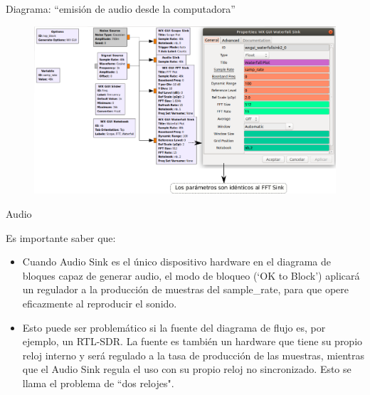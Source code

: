 \begin{frame}{Diagrama:  ``emisión de audio desde la computadora''}

\begin{figure}

\begin{center}
\vspace{-8mm}
\includegraphics[width=1.05\textwidth]{parte1/lab4/pdf/lab4_4.pdf}
\end{center}
\end{figure}

\end{frame}

\begin{frame}{Audio}

Es importante saber que:\\
\begin{itemize}
    \item
    {Cuando Audio Sink es el único dispositivo hardware en el diagrama de bloques capaz de generar audio, el modo de bloqueo (‘OK to Block’) aplicará un regulador a la producción de muestras del sample\_rate, para que opere eficazmente al reproducir el sonido\cite{Seeber2014}.}
    \item
    {Esto puede ser problemático si la fuente del diagrama de flujo es, por ejemplo, un RTL-SDR. La fuente es también un hardware que tiene su propio reloj interno y será regulado a la tasa de producción de las muestras, mientras que el Audio Sink regula el uso con su propio reloj no sincronizado. Esto se llama el problema de “dos relojes".}
\end{itemize}
\end{frame}

